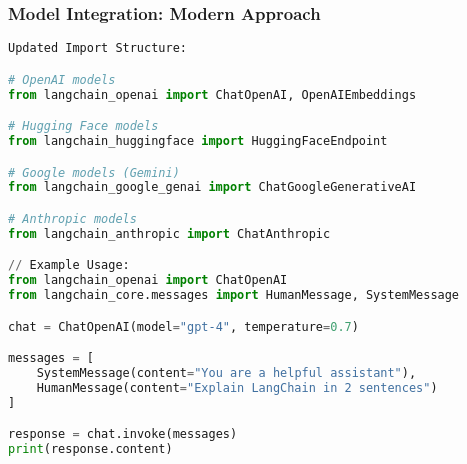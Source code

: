 \begin{frame}[fragile]\frametitle{Model Integration: Modern Approach}

\begin{lstlisting}[language=python, basicstyle=\tiny]
Updated Import Structure:

# OpenAI models
from langchain_openai import ChatOpenAI, OpenAIEmbeddings

# Hugging Face models
from langchain_huggingface import HuggingFaceEndpoint

# Google models (Gemini)
from langchain_google_genai import ChatGoogleGenerativeAI

# Anthropic models
from langchain_anthropic import ChatAnthropic

// Example Usage:
from langchain_openai import ChatOpenAI
from langchain_core.messages import HumanMessage, SystemMessage

chat = ChatOpenAI(model="gpt-4", temperature=0.7)

messages = [
    SystemMessage(content="You are a helpful assistant"),
    HumanMessage(content="Explain LangChain in 2 sentences")
]

response = chat.invoke(messages)
print(response.content)
\end{lstlisting}

\end{frame}

